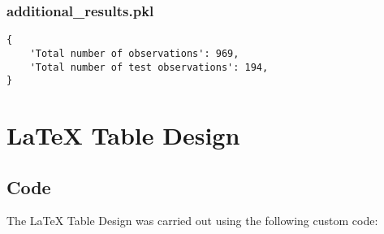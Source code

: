 \documentclass[11pt]{article}
\begin{document}
\subsubsection*{additional\_results.pkl}

\begin{Verbatim}[tabsize=4]
{
    'Total number of observations': 969,
    'Total number of test observations': 194,
}
\end{Verbatim}

\section{LaTeX Table Design}
\subsection{{Code}}
The LaTeX Table Design was carried out using the following custom code:
\end{document}
